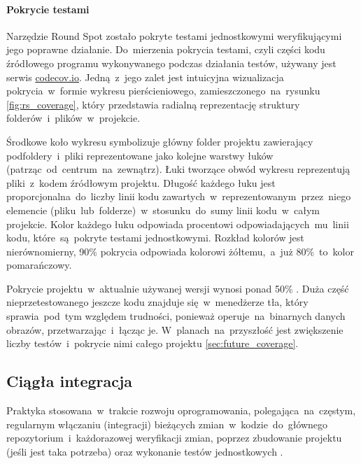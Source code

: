 \paragraph{Pokrycie testami}
\label{par:test_coverage}
Narzędzie Round Spot zostało pokryte testami jednostkowymi weryfikującymi jego poprawne działanie. Do~mierzenia pokrycia testami, czyli części kodu źródłowego programu wykonywanego podczas działania testów, używany jest serwis \href{https://codecov.io/}{codecov.io}. Jedną~z~jego zalet jest intuicyjna wizualizacja pokrycia~w~formie wykresu pierścieniowego, zamieszczonego~na~rysunku \ref{fig:rs_coverage}, który przedstawia radialną reprezentację struktury folderów~i~plików~w~projekcie. 

\bigskip
{}

Środkowe koło wykresu symbolizuje główny folder projektu zawierający podfoldery~i~pliki reprezentowane jako kolejne warstwy łuków (patrząc~od~centrum~na~zewnątrz). Łuki tworzące obwód wykresu reprezentują pliki~z~kodem źródłowym projektu. Długość każdego łuku jest proporcjonalna~do~liczby linii kodu zawartych~w~reprezentowanym~przez~niego elemencie (pliku~lub~folderze)~w~stosunku~do~sumy linii kodu~w~całym projekcie. Kolor każdego łuku odpowiada procentowi odpowiadających~mu~linii kodu, które~są~pokryte testami jednostkowymi. Rozkład kolorów jest nierównomierny, 90\% pokrycia odpowiada kolorowi żółtemu,~a~już 80\%~to~kolor pomarańczowy. 

Pokrycie projektu~w~aktualnie używanej wersji wynosi ponad 50\% \cite{RS_Coverage}. Duża część nieprzetestowanego jeszcze kodu znajduje się~w~menedżerze tła, który sprawia~pod~tym względem trudności, ponieważ operuje~na~binarnych danych obrazów, przetwarzając~i~łącząc je. W~planach~na~przyszłość jest zwiększenie liczby testów~i~pokrycie nimi całego projektu \ref{sec:future_coverage}.

\subsection{Ciągła integracja}
\label{sec:rs_ci}
Praktyka stosowana~w~trakcie rozwoju oprogramowania, polegająca~na~częstym, regularnym włączaniu (integracji) bieżących zmian~w~kodzie~do~głównego repozytorium~i~każdorazowej weryfikacji zmian, poprzez zbudowanie projektu (jeśli jest taka potrzeba) oraz wykonanie testów jednostkowych \cite{CI_definition}.

